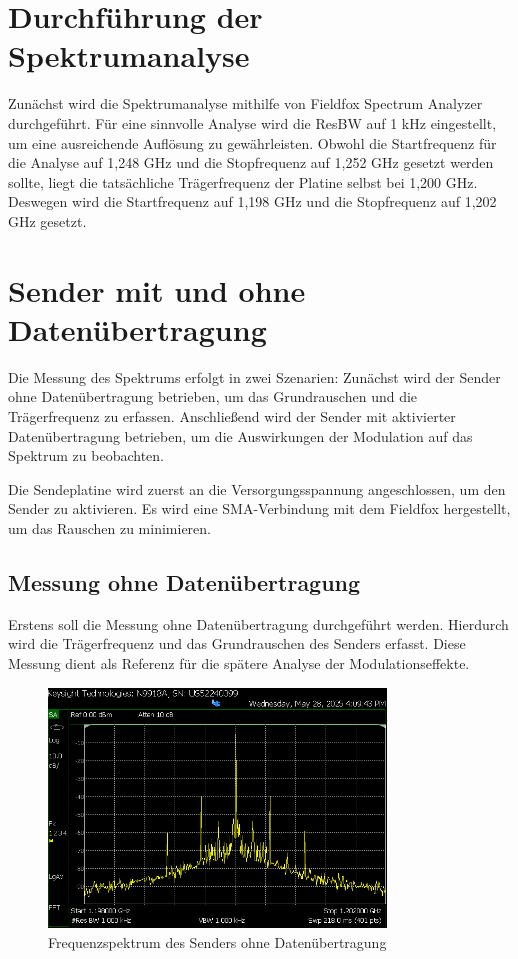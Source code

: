 \section{Durchführung der Spektrumanalyse}
Zunächst wird die Spektrumanalyse mithilfe von Fieldfox Spectrum Analyzer durchgeführt. Für eine sinnvolle Analyse wird die ResBW auf 1 kHz eingestellt, um eine ausreichende Auflösung zu gewährleisten.
Obwohl die Startfrequenz für die Analyse auf 1,248 GHz und die Stopfrequenz auf 1,252 GHz gesetzt werden sollte, liegt die tatsächliche Trägerfrequenz der Platine selbst bei 1,200 GHz. Deswegen wird die Startfrequenz auf 1,198 GHz und die Stopfrequenz auf 1,202 GHz gesetzt. 
\section{Sender mit und ohne Datenübertragung}
Die Messung des Spektrums erfolgt in zwei Szenarien: Zunächst wird der Sender ohne Datenübertragung betrieben, um das Grundrauschen und die Trägerfrequenz zu erfassen. Anschließend wird der Sender mit aktivierter Datenübertragung betrieben, um die Auswirkungen der Modulation auf das Spektrum zu beobachten.

Die Sendeplatine wird zuerst an die Versorgungsspannung angeschlossen, um den Sender zu aktivieren. Es wird eine SMA-Verbindung mit dem Fieldfox hergestellt, um das Rauschen zu minimieren. 

    \subsection{Messung ohne Datenübertragung}
    Erstens soll die Messung ohne Datenübertragung durchgeführt werden. Hierdurch wird die Trägerfrequenz und das Grundrauschen des Senders erfasst. Diese Messung dient als Referenz für die spätere Analyse der Modulationseffekte.
    \begin{figure}[H]
        \centering
        \includegraphics[width=0.8\textwidth]{Pictures/4.4.png}
        \caption{Frequenzspektrum des Senders ohne Datenübertragung}
        \label{fig:OhneDaten}
    \end{figure}
